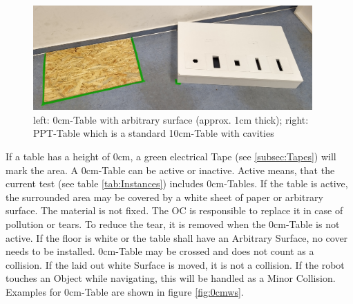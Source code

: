 \begin{figure} [h!]
	\begin{center}
		\includegraphics[height = 4cm]{./images/arena/tables_small.jpg}	
	\end{center}
	\caption{left: 0\si{\centi\meter}-Table with arbitrary surface (approx. 1\si{\centi\meter} thick); right: PPT-Table which is a standard 10\si{\centi\meter}-Table with cavities}
	\label{fig:ws}
\end{figure}

If a table has a height of $0\si{\centi\meter}$, a green electrical Tape (see \ref{subsec:Tapes}) will mark the area. A $0\si{\centi\meter}$-Table can be active or inactive. Active means, that the current test (see table \ref{tab:Instances}) includes $0\si{\centi\meter}$-Tables.
If the table is active, the surrounded area may be covered by a white sheet of paper or arbitrary surface. The material is not fixed.
The OC is responsible to replace it in case of pollution or tears. To reduce the tear, it is removed when the $0\si{\centi\meter}$-Table is not active. If the floor is white or the table shall have an Arbitrary Surface, no cover needs to be installed.
$0\si{\centi\meter}$-Table may be crossed and does not count as a collision. If the laid out white Surface is moved, it is not a collision.
If the robot touches an Object while navigating, this will be handled as a Minor Collision. Examples for $0\si{\centi\meter}$-Table are shown in figure \ref{fig:0cmws}.



